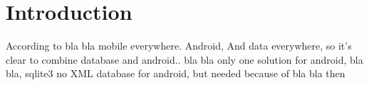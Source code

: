 \chapter{Introduction}
According to bla bla mobile everywhere. Android, And data everywhere, so it's clear to combine database and android.. bla bla
only one solution for android, bla bla, sqlite3
no XML database for android, but needed because of bla bla
then 


